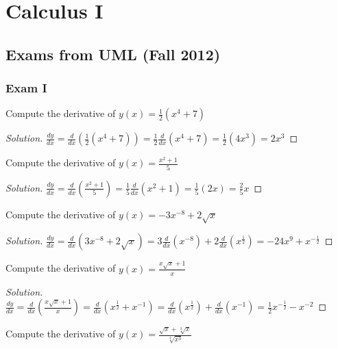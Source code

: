 \documentclass[crop=false,class=article,oneside]{standalone}
\begin{document}
    \ifx\ifmathcoursescalculusI\undefined
        \section*{Calculus I}
        \setcounter{section}{1}
    \fi
    \subsection{Exams from UML (Fall 2012)}
        \subsubsection{Exam I}
            \begin{problem}
            Compute the derivative of $y(x)=\frac{1}{2}(x^{4}+7)$
            \end{problem}
            \begin{proof}[Solution]
            $\frac{dy}{dx}=\frac{d}{dx}(\frac{1}{2}(x^{4}+7))=\frac{1}{2}\frac{d}{dx}(x^{4}+7)=\frac{1}{2}(4x^{3})=2x^{3}$
            \end{proof}
            \begin{problem}
            Compute the derivative of $y(x)=\frac{x^{2}+1}{5}$
            \end{problem}
            \begin{proof}[Solution]
            $\frac{dy}{dx}=\frac{d}{dx}(\frac{x^{2}+1}{5})=\frac{1}{5}\frac{d}{dx}(x^{2}+1)=\frac{1}{5}(2x)=\frac{2}{5}x$
            \end{proof}
            \begin{problem}
            Compute the derivative of $y(x)=-3x^{-8}+2\sqrt{x}$
            \end{problem}
            \begin{proof}[Solution]
            $\frac{dy}{dx}=\frac{d}{dx}(3x^{-8}+2\sqrt{x})=3\frac{d}{dx}(x^{-8})+2\frac{d}{dx}(x^{\frac{1}{2}})=-24x^{9}+x^{-\frac{1}{2}}$
            \end{proof}
            \begin{problem}
            Compute the derivative of $y(x)=\frac{x\sqrt{x}+1}{x}$
            \end{problem}
            \begin{proof}[Solution]
            $\frac{dy}{dx}=\frac{d}{dx}(\frac{x\sqrt{x}+1}{x})=\frac{d}{dx}(x^{\frac{1}{2}}+x^{-1})=\frac{d}{dx}(x^{\frac{1}{2}})+\frac{d}{dx}(x^{-1})=\frac{1}{2}x^{-\frac{1}{2}}-x^{-2}$
            \end{proof}
            \begin{problem}
            Compute the derivative of $y(x)=\frac{\sqrt{x}+\sqrt[3]{x}}{\sqrt[4]{x^{3}}}$
            \end{problem}
\end{document}
